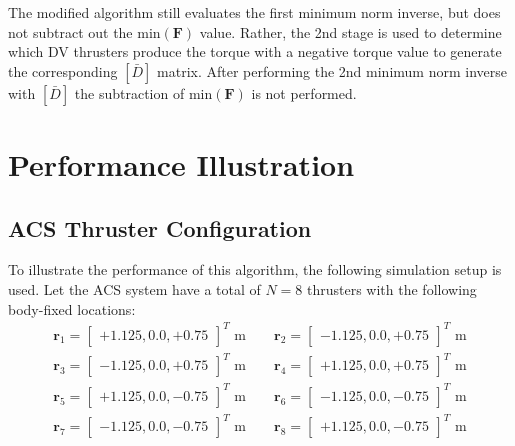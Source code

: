 \documentclass[]{BasiliskReportMemo}
\begin{document}
The modified algorithm still evaluates the first minimum norm inverse, but does not subtract out the $\text{min}(\bm F)$ value.  Rather, the 2nd stage is used to determine which DV thrusters produce the torque with a negative torque value to generate the corresponding $[\bar D]$ matrix.  After performing the 2nd minimum norm inverse with $[\bar D]$ the subtraction of  $\text{min}(\bm F)$ is not performed.  






\section{Performance Illustration}
\subsection{ACS Thruster Configuration}
To illustrate the performance of this algorithm, the following simulation setup is used.  Let the ACS system have a total of $N = 8$ thrusters with the following body-fixed locations:
\begin{gather*}
	\label{eq:th:loc}
	\bm r_{1} = \begin{bmatrix} +1.125, 0.0, +0.75  \end{bmatrix}^{T} \text{ m}
	\quad\quad
	\bm r_{2} = \begin{bmatrix} -1.125, 0.0, +0.75  \end{bmatrix}^{T} \text{ m}
	\\
	\bm r_{3} = \begin{bmatrix} -1.125, 0.0, +0.75  \end{bmatrix}^{T}	 \text{ m}
	\quad\quad
	\bm r_{4} = \begin{bmatrix} +1.125, 0.0, +0.75  \end{bmatrix}^{T} \text{ m}
	\\
	\bm r_{5} = \begin{bmatrix} +1.125, 0.0, -0.75  \end{bmatrix}^{T}	 \text{ m}
	\quad\quad
	\bm r_{6} = \begin{bmatrix} -1.125, 0.0, -0.75  \end{bmatrix}^{T} \text{ m}
	\\
	\bm r_{7} = \begin{bmatrix} -1.125, 0.0, -0.75  \end{bmatrix}^{T}	 \text{ m}
	\quad\quad
	\bm r_{8} = \begin{bmatrix} +1.125, 0.0, -0.75  \end{bmatrix}^{T} \text{ m}
\end{gather*}
\end{document}
